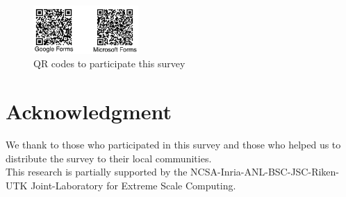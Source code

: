 \documentclass[sigconf,nonacm]{acmart}
\begin{document}
\begin{figure}[htb]
\begin{center}
\includegraphics[width=4cm]{figs/QR-codes.pdf}
\caption{QR codes to participate this survey}
\label{fig:qrcodes}
\end{center}
\end{figure}

\section*{Acknowledgment}
  We thank to those who participated in this survey and those who
  helped us to distribute the survey to their local communities.\\
  This research is partially supported by the
  NCSA-Inria-ANL-BSC-JSC-Riken-UTK Joint-Laboratory for Extreme Scale
  Computing\cite{JLESC}.



\end{document}
